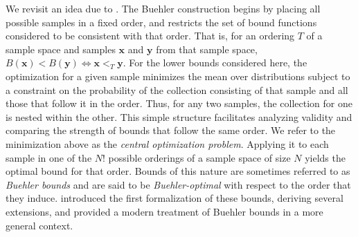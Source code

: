 \documentclass{article}
\theoremstyle{definition}
\theoremstyle{remark}
\newcommand{\y}{\mathbf{y}}
\def\y{\mathbf{y}}
\def\x{\mathbf{x}}
\begin{document}
We revisit an idea due to \cite{Buehler1957}. The Buehler construction begins by placing all possible samples in a fixed order, and restricts the set of bound functions considered to be consistent with that order. That is, for an ordering $T$ of a sample space and samples $\x$ and $\y$ from that sample space, $B(\x)< B(\y) \iff \x <_T \y$. %
For the lower bounds considered here, the optimization for a given sample minimizes the mean over distributions subject to a constraint on the probability of the collection consisting of that sample and all those that follow it in the order. Thus, for any two samples, the collection for one is nested within the other. This simple structure facilitates analyzing validity and comparing the strength of bounds that follow the same order. We refer to the minimization above as the {\em central optimization problem}. Applying it to each sample in one of the $N!$ possible orderings of a sample space of size $N$ yields the optimal bound for that order.\color{black} Bounds of this nature are sometimes referred to as \emph{Buehler bounds} and are said to be \emph{Buehler-optimal} with respect to the order that they induce. \cite{GuerreroDavid1985Buehler} introduced the first formalization of these bounds, deriving several extensions, and \cite{LloydKabaila2003} provided a modern treatment of Buehler bounds in a more general context.
\end{document}
